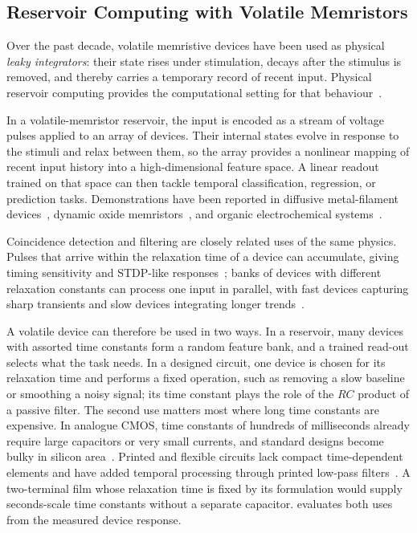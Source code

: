 \documentclass[12pt, twoside]{report}
\begin{document}
\subsection{Reservoir Computing with Volatile Memristors}\label{subsec:volatile_reservoir}

Over the past decade, volatile memristive devices have been used as physical \textit{leaky integrators}: their state rises under stimulation, decays after the stimulus is removed, and thereby carries a temporary record of recent input. Physical reservoir computing provides the computational setting for that behaviour~\cite{Tanaka2019}.

In a volatile-memristor reservoir, the input is encoded as a stream of voltage pulses applied to an array of devices. Their internal states evolve in response to the stimuli and relax between them, so the array provides a nonlinear mapping of recent input history into a high-dimensional feature space. A linear readout trained on that space can then tackle temporal classification, regression, or prediction tasks. Demonstrations have been reported in diffusive metal-filament devices~\cite{Du2017, Midya2019}, dynamic oxide memristors~\cite{Zhong2021}, and organic electrochemical systems~\cite{Cucchi2021}.

Coincidence detection and filtering are closely related uses of the same physics. Pulses that arrive within the relaxation time of a device can accumulate, giving timing sensitivity and STDP-like responses~\cite{Bichler2012}; banks of devices with different relaxation constants can process one input in parallel, with fast devices capturing sharp transients and slow devices integrating longer trends~\cite{IndiveriLiu2015, Sangwan2020}.

A volatile device can therefore be used in two ways. In a reservoir, many devices with assorted time constants form a random feature bank, and a trained read-out selects what the task needs. In a designed circuit, one device is chosen for its relaxation time and performs a fixed operation, such as removing a slow baseline or smoothing a noisy signal; its time constant plays the role of the $RC$ product of a passive filter. The second use matters most where long time constants are expensive. In analogue CMOS, time constants of hundreds of milliseconds already require large capacitors or very small currents, and standard designs become bulky in silicon area~\cite{IndiveriSandamirskaya2019}. Printed and flexible circuits lack compact time-dependent elements and have added temporal processing through printed low-pass filters~\cite{Zhao2023PrintedFilters}. A two-terminal film whose relaxation time is fixed by its formulation would supply seconds-scale time constants without a separate capacitor.  evaluates both uses from the measured device response.
\end{document}
